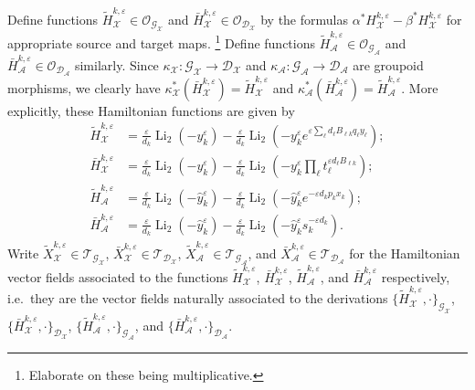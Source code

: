 \documentclass{amsart}
\numberwithin{equation}{section}
\newcommand{\cA}{\mathcal{A}}
\newcommand{\cG}{\mathcal{G}}
\newcommand{\cD}{\mathcal{D}}
\newcommand{\cO}{\mathcal{O}}
\newcommand{\cX}{\mathcal{X}}
\newcommand{\cT}{\mathcal{T}}
\newcommand{\Li}{\operatorname{Li}}
\begin{document}
Define functions $\tilde H_\cX^{k,\varepsilon}\in\cO_{\cG_\cX}$ and $\bar H_\cX^{k,\varepsilon}\in\cO_{\cD_\cX}$ by the formulas $\alpha^* H_\cX^{k,\varepsilon}-\beta^* H_\cX^{k,\varepsilon}$ for appropriate source and target maps. \footnote{Elaborate on these being multiplicative.}
Define functions $\tilde H_\cA^{k,\varepsilon}\in\cO_{\cG_\cA}$ and $\bar H_\cA^{k,\varepsilon}\in\cO_{\cD_\cA}$ similarly.
Since $\kappa_\cX:\cG_\cX\to\cD_\cX$ and $\kappa_\cA:\cG_\cA\to\cD_\cA$ are groupoid morphisms, we clearly have $\kappa_\cX^*(\bar H_\cX^{k,\varepsilon})=\tilde H_\cX^{k,\varepsilon}$ and $\kappa_\cA^*(\bar H_\cA^{k,\varepsilon})=\tilde H_\cA^{k,\varepsilon}$.
More explicitly, these Hamiltonian functions are given by
\begin{align*}
  \tilde H_\cX^{k,\varepsilon}&=\frac{\varepsilon}{d_k}\Li_2(-y_k^\varepsilon)-\frac{\varepsilon}{d_k}\Li_2\left(-y_k^\varepsilon e^{\varepsilon\sum_\ell d_\ell B_{\ell k}q_\ell y_\ell}\right);\\
  \bar H_\cX^{k,\varepsilon}&=\frac{\varepsilon}{d_k}\Li_2(-y_k^\varepsilon)-\frac{\varepsilon}{d_k}\Li_2\left(-y_k^\varepsilon\prod_\ell t_\ell^{\varepsilon d_\ell B_{\ell k}}\right);\\
  \tilde H_\cA^{k,\varepsilon}&=\frac{\varepsilon}{d_k}\Li_2(-\hat y_k^\varepsilon)-\frac{\varepsilon}{d_k}\Li_2\left(-\hat y_k^\varepsilon e^{-\varepsilon d_kp_kx_k}\right);\\
  \bar H_\cA^{k,\varepsilon}&=\frac{\varepsilon}{d_k}\Li_2(-\hat y_k^\varepsilon)-\frac{\varepsilon}{d_k}\Li_2\left(-\hat y_k^\varepsilon s_k^{-\varepsilon d_k}\right).
\end{align*}
Write $\tilde X_\cX^{k,\varepsilon}\in\cT_{\cG_\cX}$, $\bar X_\cX^{k,\varepsilon}\in\cT_{\cD_\cX}$, $\tilde X_\cA^{k,\varepsilon}\in\cT_{\cG_\cA}$, and $\bar X_\cA^{k,\varepsilon}\in\cT_{\cD_\cA}$ for the Hamiltonian vector fields associated to the functions $\tilde H_\cX^{k,\varepsilon}$, $\bar H_\cX^{k,\varepsilon}$, $\tilde H_\cA^{k,\varepsilon}$, and $\bar H_\cA^{k,\varepsilon}$ respectively, i.e.\ they are the vector fields naturally associated to the derivations $\{\tilde H_\cX^{k,\varepsilon},\cdot\}_{\cG_\cX}$, $\{\bar H_\cX^{k,\varepsilon},\cdot\}_{\cD_\cX}$, $\{\tilde H_\cA^{k,\varepsilon},\cdot\}_{\cG_\cA}$, and $\{\bar H_\cA^{k,\varepsilon},\cdot\}_{\cD_\cA}$.
\end{document}
